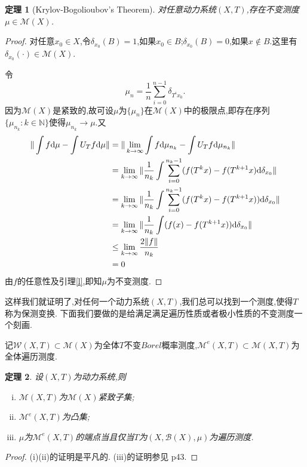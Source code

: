 \documentclass[a4paper,11pt,oneside]{book}
\newtheorem{theorem}{\textbf{\hspace{0.7cm}定理}}[section]
\newcommand{\ms}[1]{\mathscr{#1}}
\begin{document}
\begin{theorem}[Krylov-Bogolioubov's Theorem]
对任意动力系统$(X,T)$,存在不变测度$\mu\in\mathcal{M}(X)$.
\end{theorem}
\begin{proof}
对任意$x_0\in X$,令$\delta_{x_0}(B)=1$,如果$x_0\in B$;$\delta_{x_0}(B)=0$,如果$x\notin B$.这里有$\delta_{x_0}(\cdot)\in\mathcal{M}(X)$.

令$$\mu_n=\frac{1}{n}\sum_{i=0}^{n-1}\delta_{T^ix_0}.$$
因为$\mathcal{M}(X)$是紧致的,故可设$\mu$为$\{\mu_n\}$在$\mathcal{M}(X)$中的极限点,即存在序列$\{\mu_{n_k}:k\in\mathbb{N}\}$使得$\mu_{n_k}\rightarrow \mu$.又
\begin{align*}
\|\int f \mathrm{d}\mu -\int U_Tf\mathrm{d}\mu\|&=\|\lim_{k\to\infty}\int f \mathrm{d}\mu_{n_k} -\int U_Tf\mathrm{d}\mu_{n_k}\|\\
&=\lim_{k\to\infty}\|\frac{1}{n_k}\int\sum_{i=0}^{n_k-1}(f(T^kx)-f(T^{k+1}x)\mathrm{d}\delta_{x_0}\|\\
&=\lim_{k\to\infty}\|\frac{1}{n_k}\int\sum_{i=0}^{n_k-1}(f(T^kx)-f(T^{k+1}x))\mathrm{d}\delta_{x_0} \|\\
&=\lim_{k\to\infty}\|\frac{1}{n_k}\int(f(x)-f(T^{k+1}x))\mathrm{d}\delta_{x_0} \|\\
&\leq \lim_{k\to\infty}{2\|f\|\over n_k}\\
&=0
\end{align*}
由$f$的任意性及引理\ref{l},即知$\mu$为不变测度.
\end{proof}

这样我们就证明了,对任何一个动力系统$(X,T)$,我们总可以找到一个测度,使得$T$称为保测变换.
下面我们要做的是给满足满足遍历性质或者极小性质的不变测度一个刻画.

记$\mathcal{W}(X,T)\subset\mathcal{M}(X)$为全体$T$不变$Borel$概率测度,$\mathcal{M}^e(X,T)\subset\mathcal{M}(X,T)$为全体遍历测度.

\begin{theorem}
设$(X,T)$为动力系统,则
\begin{enumerate}[(i)]
\item $\mathcal{M}(X,T)$为$\mathcal{M}(X)$紧致子集;
\item $\mathcal{M}^e(X,T)$为凸集;
\item $\mu$为$\mathcal{M}^e(X,T)$的端点当且仅当$T$为$(X,\ms B(X),\mu)$为遍历测度.
\end{enumerate}
\end{theorem}
\begin{proof}
(i)(ii)的证明是平凡的.
(iii)的证明参见\cite{hy} p43.
\end{proof}
\end{document}
